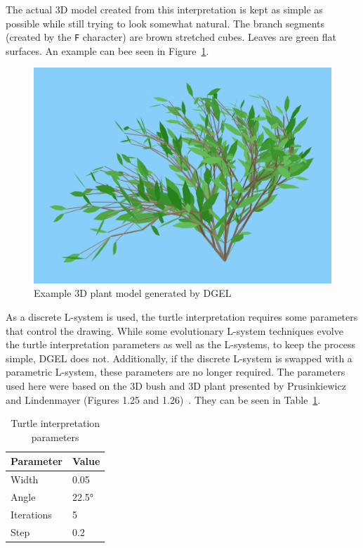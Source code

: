 The actual 3D model created from this interpretation is kept as simple as possible while still trying to look somewhat natural.
The \glspl{branch segment} (created by the \texttt{F} character) are brown stretched cubes.
Leaves are green flat surfaces.
An example can bee seen in Figure~\ref{fig:example-model}.

\begin{figure}
    \centering
    \includegraphics[width=1.0\textwidth]{figures/example-plant}
    \caption[Example 3D plant model generated by DGEL]{Example 3D plant model generated by \gls{DGEL}}
    \label{fig:example-model}
\end{figure}

As a discrete \gls{L-system} is used, the turtle interpretation requires some parameters that control the drawing.
While some evolutionary \gls{L-system} techniques evolve the turtle interpretation parameters as well as the \glspl{L-system}, to keep the process simple, \gls{DGEL} does not.
Additionally, if the discrete \gls{L-system} is swapped with a parametric \gls{L-system}, these parameters are no longer required.
The parameters used here were based on the 3D bush and 3D plant presented by Prusinkiewicz and Lindenmayer (Figures 1.25 and 1.26)~\cite{2012Prusinkiewicz}.
They can be seen in Table~\ref{tab:turtle-param}.

\begin{table}
    \centering
    \begin{tabular}{| l | l |}
    \hline
    \textbf{Parameter} & \textbf{Value} \\ \hline
    Width & 0.05 \\ \hline
    Angle & 22.5° \\ \hline
    Iterations & 5 \\ \hline
    Step & 0.2 \\
    \hline
    \end{tabular}
    \caption{Turtle interpretation parameters}
    \label{tab:turtle-param}
\end{table}

